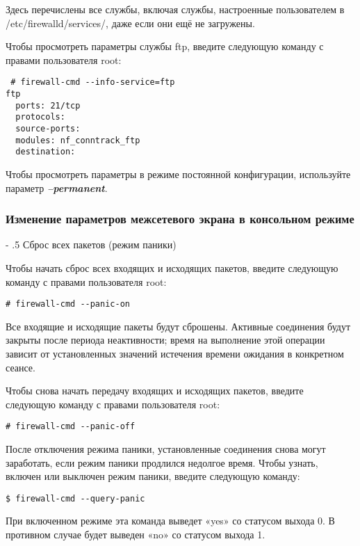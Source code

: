 \documentclass[a4paper,10pt,twoside]{article}
\makeatletter
\renewcommand\paragraph{%
   \@startsection{paragraph}{4}{0mm}%
      {-\baselineskip}%
      {.5\baselineskip}%
      {\normalfont\normalsize\bfseries}}
\makeatother
\begin{document}
Здесь перечислены все службы, включая службы,  настроенные пользователем в /etc/firewalld/services/, даже если они ещё не загружены.

Чтобы просмотреть параметры службы ftp, введите следующую команду с правами пользователя root: 
\begin{verbatim}
 # firewall-cmd --info-service=ftp
ftp
  ports: 21/tcp
  protocols: 
  source-ports: 
  modules: nf_conntrack_ftp
  destination:
\end{verbatim} 

Чтобы просмотреть параметры в режиме постоянной конфигурации, используйте параметр \textit{\textbf{--permanent}}.


\subsubsection{Изменение параметров межсетевого экрана в консольном режиме}

\paragraph{Сброс всех пакетов (режим паники)}

Чтобы начать сброс всех входящих и исходящих пакетов, введите следующую команду с правами пользователя root: 
\begin{verbatim}
# firewall-cmd --panic-on
\end{verbatim} 

Все входящие и исходящие пакеты будут сброшены. Активные соединения будут закрыты после периода неактивности; время на выполнение этой операции зависит от установленных значений истечения времени ожидания в конкретном сеансе.
 
Чтобы снова начать передачу входящих и исходящих пакетов, введите следующую команду с правами пользователя root: 
\begin{verbatim}
# firewall-cmd --panic-off
\end{verbatim} 

После отключения режима паники, установленные соединения снова могут заработать, если режим паники продлился недолгое время. Чтобы узнать, включен или выключен режим паники, введите следующую команду: 
\begin{verbatim}
$ firewall-cmd --query-panic
\end{verbatim} 
При включенном режиме эта команда выведет «yes» со статусом выхода 0. В противном случае будет выведен «no» со статусом выхода 1.
\end{document}
